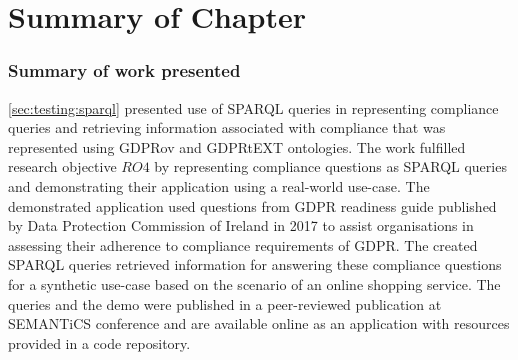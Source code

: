 
\section{Summary of Chapter}\label{sec:testing:conclusion}

\subsubsection*{Summary of work presented}
\autoref{sec:testing:sparql} presented use of SPARQL queries in representing compliance queries and retrieving information associated with compliance that was represented using GDPRov and GDPRtEXT ontologies.
The work fulfilled research objective $RO4$ by representing compliance questions as SPARQL queries and demonstrating their application using a real-world use-case.
The demonstrated application used questions from GDPR readiness guide published by Data Protection Commission of Ireland in 2017 to assist organisations in assessing their adherence to compliance requirements of GDPR.
The created SPARQL queries retrieved information for answering these compliance questions for a synthetic use-case based on the scenario of an online shopping service.
The queries and the demo were published in a peer-reviewed publication \cite{pandit_queryable_2018} at SEMANTiCS conference and are available online as an application with resources provided in a code repository.

